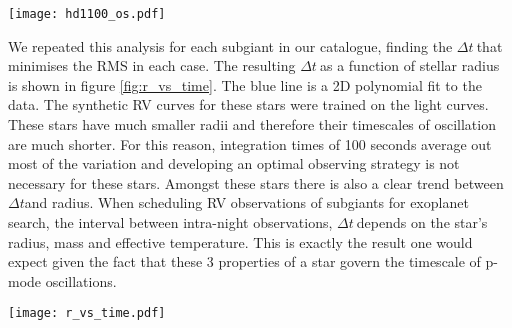 \documentclass[useAMS, usenatbib]{aastex}
\newcommand{\dt}{$\Delta t$}
\begin{document}
\begin{figure*}
\begin{center}
\texttt{[image: hd1100\_os.pdf]}
\caption{{\it (Top)} Synthetic 10 day RV curve for HD1100, a 1.255$\pm$0.12
M$_\odot$, 5.47$\pm$0.667 R$_\odot$ subgiant. {\it(Bottom)} RMS vs \dt. The
faint orange lines show the variation in RMS as a function of \dt$~$for a range
of starting times. The solid orange line shows the mean of these lines. The
solid orange line shows the effect of marginalising over the starting times.}
\label{fig:os}
\end{center}
\end{figure*}

We repeated  this analysis for each subgiant in our catalogue, finding the
\dt$~$that minimises the RMS in each case.
The resulting \dt$~$as a function of stellar radius is shown in figure
\ref{fig:r_vs_time}.
The blue line is a 2D polynomial fit to the data.
The synthetic RV curves for these stars were trained on the light curves.
These stars have much smaller radii and therefore their timescales of
oscillation are much shorter.
For this reason, integration times of 100 seconds average out most of the
variation and developing an optimal observing strategy is not necessary for
these stars.
Amongst these stars there is also a clear trend between \dt and radius.
When scheduling RV observations of subgiants for exoplanet search, the interval
between intra-night observations, \dt$~$depends on the star's radius, mass and
effective temperature.
This is exactly the result one would expect given the fact that these
3 properties of a star govern the timescale of p-mode oscillations.

\begin{figure*}
\begin{center}
\texttt{[image: r\_vs\_time.pdf]}
\caption{Radius vs \dt. This plot shows how the optimal observing interval,
\dt, varies as a function of subgiant radius. The blue line is a 2D polynomial
fit to the data.}
\label{fig:r_vs_time}
\end{center}
\end{figure*}

\end{document}
